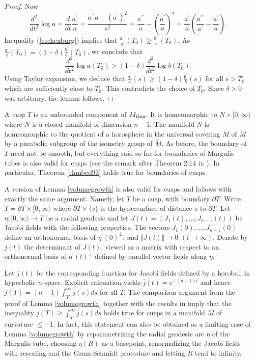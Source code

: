 \documentclass[11pt]{amsart}
\theoremstyle{plain}
\theoremstyle{plain}
\theoremstyle{definition}
\begin{document}
\begin{proof}
Now 
\[\frac{d^2}{dt^2}\log a=\frac{d}{dt}\frac{a^\prime}{a}=\frac{a^{\prime\prime}a-(a^\prime)^2}{a^2}
=\frac{a^{\prime\prime}}{a}-(\frac{a^\prime}{a})^2=\frac{a^\prime}{a}(\frac{a^{\prime\prime}}{a^\prime}-
\frac{a^\prime}{a}).\]
Inequality (\ref{eschenburg}) implies that 
$\frac{a^{\prime\prime}}{a^\prime}(T_0)\geq 
\frac{b^{\prime\prime}}{b^\prime}(T_0)$.
As $\frac{a^\prime}{a}(T_0)=(1-\delta)\frac{b^\prime}{b}(T_0)$,
we conclude that
\[\frac{d^2}{dt^2}\log a(T_0)> (1-\delta)
\frac{d^2}{dt^2}\log b(T_0).\]
Using Taylor expansion, we deduce that
$\frac{a^\prime}{a}(s)\geq (1-\delta)\frac{b^\prime}{b}(s)$ for all $s>T_0$ 
which are sufficiently close to $T_0$. This  
contradicts the choice of $T_0$. 
Since $\delta >0$ was arbitrary, the lemma follows.
\end{proof}





A \emph{cusp} $T$ is an unbounded component of $M_{\rm thin}$. 
It is homeomorphic to $N\times [0,\infty)$ where
$N$ is a closed manifold of dimension $n-1$. 
The manifold $N$ is 
homeomorphic to the quotient of 
a horosphere in the universal covering $\tilde M$ of $M$ 
by a parabolic subgroup of the isometry group of 
$\tilde M$. 
As before, the boundary of $T$ need not be smooth, but
everything said so far for boundaries of Margulis tubes
is also valid for cusps (see the remark after Theorem 2.14 in 
\cite{BCD93}). In particular, 
Theorem \ref{thmbcd93} holds true for boundaries of cusps.





A version of Lemma \ref{volumegrowth} is also valid for cusps and follows with exactly the same
argument. Namely, let $T$ be a cusp, with boundary $\partial T$. Write $T=\partial T\times [0,\infty)$ where
$\partial T\times \{s\}$ is the hypersurface of distance $s$ to $\partial T$. 
Let $\eta:[0,\infty)\to T$ be a radial
geodesic and let $J(t)=(J_1(t),\dots,J_{n-1}(t))$ be Jacobi fields with the following properties. 
The vectors $J_1(0),\dots,J_{n-1}(0)$ define an orthonormal basis of 
$\eta^\prime(0)^\perp$, and $\Vert J(t)\Vert \to 0$ $(t\to \infty)$. Denote by $j(t)$ the 
determinant of $J(t)$, viewed as a matrix with respect to 
an orthonormal basis of $\eta^\prime(t)^\perp$ defined by parallel vector fields along $\eta$.

 Let $\bar j(t)$ be the corresponding function for Jacobi fields defined by a horoball in hyperbolic 
 $n$-space. Explicit calcuation yields $\bar j(t)=e^{-(n-1)t}$ and hence
 $\bar j(T)= (n-1)\int_T^\infty \bar j(s)ds$ for all $T$. 
 The comparison argument from the proof of 
 Lemma \ref{volumegrowth} together with the results in \cite{E87}  
 imply that the inequality $j(T)\geq \int_T^\infty j(s)ds$ holds true for cusps in 
 a manifold $M$ of curvature $\leq -1$. In fact, this statement can also be obtained as a limiting
 case  of Lemma \ref{volumegrowth} by reparametrizing 
the radial geodesic arc $\eta$ of the Margulis tube, 
choosing $\eta(R)$ as a basepoint, renormalizing 
the Jacobi fields with rescaling and the Gram-Schmidt procedure 
and letting $R$ tend to infinity. 
\end{document}
